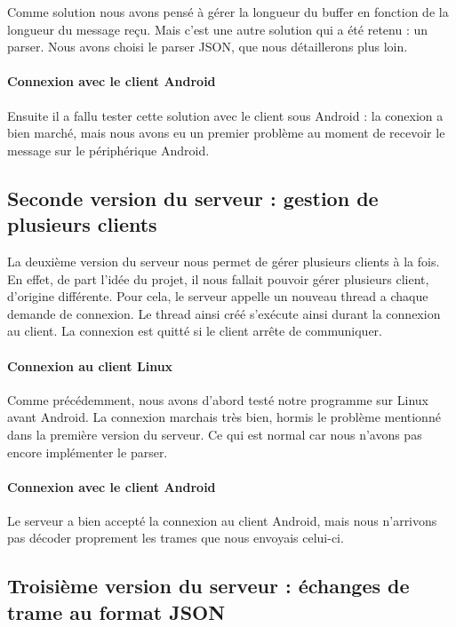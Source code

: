 \documentclass[a4paper,10pt]{article}
\begin{document}
Comme solution nous avons pensé à gérer la longueur du buffer en fonction de la longueur du message reçu. Mais c'est une autre solution qui a été retenu : un parser. Nous avons choisi le parser JSON, que nous détaillerons plus loin.


\paragraph{Connexion avec le client Android}
Ensuite il a fallu tester cette solution avec le client sous Android : la conexion a bien marché, mais nous avons eu un premier problème au moment de recevoir le message sur le périphérique Android.

\subsection{Seconde version du serveur : gestion de plusieurs clients}
La deuxième version du serveur nous permet de gérer plusieurs clients à la fois. En effet, de part l'idée du projet, il nous fallait pouvoir gérer plusieurs client, d'origine différente. Pour cela, le serveur appelle un nouveau thread a chaque demande de connexion. Le thread ainsi créé s'exécute ainsi durant la connexion au client. La connexion est quitté si le client arrête de communiquer. 

\paragraph{Connexion au client Linux}
Comme précédemment, nous avons d'abord testé notre programme sur Linux avant Android. La connexion marchais très bien, hormis le problème mentionné dans la première version du serveur. Ce qui est normal car nous n'avons pas encore implémenter le parser.

\paragraph{Connexion avec le client Android}
Le serveur a bien accepté la connexion au client Android, mais nous n'arrivons pas décoder proprement les trames que nous envoyais celui-ci.

\subsection{Troisième version du serveur : échanges de trame au format JSON}
\end{document}
